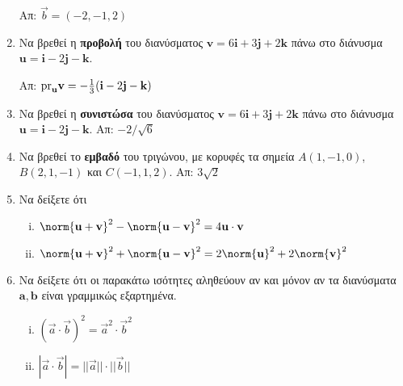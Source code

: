 \begin{enumerate}[itemsep=0.7\baselineskip]
    \hfill Απ: $ \vec{b}=(-2,-1,2) $

  \item Να βρεθεί η \textbf{προβολή} του διανύσματος 
    $ \mathbf{v} = 6 \mathbf{i}+3 \mathbf{j} + 2 \mathbf{k} $ πάνω στο διάνυσμα 
    $ \mathbf{u} = \mathbf{i}-2 \mathbf{j} - \mathbf{k} $.

    \hfill Απ: $ \rm{pr}_{\mathbf{u}}{\mathbf{v}} = -\frac{1}{3} (\mathbf{i}-2
    \mathbf{j}- \mathbf{k}) $ 

  \item Να βρεθεί η \textbf{συνιστώσα} του διανύσματος 
    $ \mathbf{v} = 6 \mathbf{i}+3 \mathbf{j} + 2 \mathbf{k} $ πάνω στο διάνυσμα 
    $ \mathbf{u} = \mathbf{i}-2 \mathbf{j} - \mathbf{k} $.  
    \hfill Απ: $ -2/ \sqrt{6} $ 

  \item Να βρεθεί το \textbf{εμβαδό} του τριγώνου, με κορυφές τα σημεία $ A(1,-1,0) $, 
    $ B(2,1,-1) $ και $ C(-1,1,2) $. 
    \hfill Απ: $ 3 \sqrt{2} $ 


  \item Να δείξετε ότι 
    \begin{enumerate}[(i)]
      \item $ \norm{\mathbf{u}+ \mathbf{v}}^{2} - \norm{\mathbf{u}- \mathbf{v}}^{2} 
        = 4 \mathbf{u}\cdot \mathbf{v} $
      \item $ \norm{\mathbf{u}+ \mathbf{v}}^{2} + \norm{\mathbf{u}- \mathbf{v}}^{2} 
        = 2 \norm{\mathbf{u}} ^{2} + 2 \norm{\mathbf{v}} ^{2} $
    \end{enumerate}

  \item Να δείξετε ότι οι παρακάτω ισότητες αληθεύουν αν και μόνον αν 
    τα διανύσματα $ \mathbf{a}, \mathbf{b} $ είναι γραμμικώς εξαρτημένα.
    \begin{enumerate}[(i)]
      \item $(\vec{a}\cdot \vec{b})^{2} = \vec{a}^{2}\cdot \vec{b}^{2}$
      \item $|\vec{a}\cdot \vec{b}| = ||\vec{a}|| \cdot ||\vec{b}||$
    \end{enumerate}


\end{enumerate}
